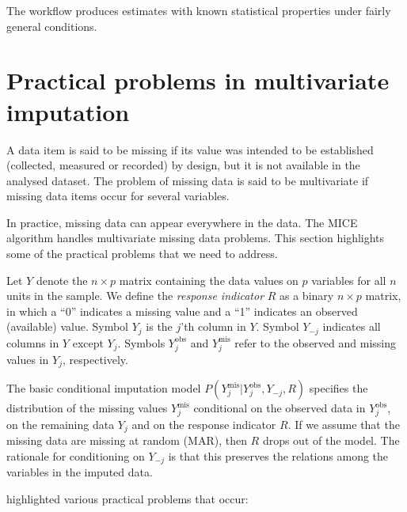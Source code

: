 \documentclass[
]{book}
\begin{document}
The workflow produces estimates with known statistical properties under fairly general conditions.

\section{Practical problems in multivariate imputation}\label{practical-problems-in-multivariate-imputation}

A data item is said to be missing if its value was intended to be established (collected, measured or recorded) by design, but it is not available in the analysed dataset. The problem of missing data is said to be multivariate if missing data items occur for several variables.

In practice, missing data can appear everywhere in the data. The MICE algorithm handles multivariate missing data problems. This section highlights some of the practical problems that we need to address.

Let \(Y\) denote the \(n \times p\) matrix containing the data values on \(p\) variables for all \(n\) units in the sample. We define the \emph{response indicator} \(R\) as a binary \(n \times p\) matrix, in which a ``0'' indicates a missing value and a ``1'' indicates an observed (available) value. Symbol \(Y_j\) is the \(j\)'th column in \(Y\). Symbol \(Y_{-j}\) indicates all columns in \(Y\) except \(Y_j\). Symbols \(Y_j^\mathrm{obs}\) and \(Y_j^\mathrm{mis}\) refer to the observed and missing values in \(Y_j\), respectively.

The basic conditional imputation model \(P(Y_j^\mathrm{mis}|Y_j^\mathrm{obs}, Y_{-j}, R)\) specifies the distribution of the missing values \(Y_j^\mathrm{mis}\) conditional on the observed data in \(Y_j^\mathrm{obs}\), on the remaining data \(Y_j\) and on the response indicator \(R\). If we assume that the missing data are missing at random (MAR), then \(R\) drops out of the model. The rationale for conditioning on \(Y_{-j}\) is that this preserves the relations among the variables in the imputed data.

\citet{VANBUUREN2018} highlighted various practical problems that occur:
\end{document}
